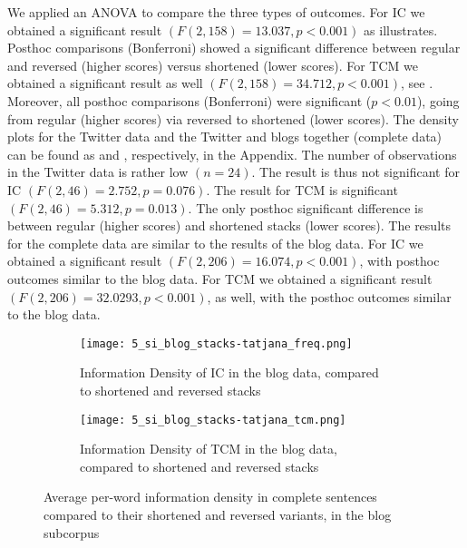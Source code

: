 \documentclass[output=paper,colorlinks,citecolor=brown]{langscibook}
\begin{document}
We applied an ANOVA to compare the three types of outcomes.  For IC we obtained a significant result $(F(2,158)= 13.037, p<0.001)$ as  illustrates.  Posthoc comparisons (Bonferroni) showed a significant difference between regular and reversed (higher scores) versus shortened (lower scores). For TCM we obtained a significant result as well $(F(2,158)= 34.712, p<0.001)$,  see . Moreover, all posthoc comparisons (Bonferroni) were significant ($p <0.01$), going from regular (higher scores) via reversed to shortened (lower scores). The density plots for the Twitter data and the Twitter and blogs together (complete data) can be found as  and , respectively, in the Appendix. The number of observations in the Twitter data is rather low $(n=24)$. The result is thus not significant for IC $(F(2,46) = 2.752, p=0.076)$. The  result for TCM is significant $(F(2,46) = 5.312, p=0.013)$. The only posthoc significant difference is between regular (higher scores) and shortened stacks (lower scores). The results for the complete data are similar to the results of the blog data. For IC we obtained a significant result $(F(2,206)= 16.074, p<0.001)$, with posthoc outcomes similar to the blog data. For TCM we obtained a significant result $(F(2,206)= 32.0293, p<0.001)$, as well, with the posthoc outcomes similar to the blog data.

\begin{figure}[t]
  \centering
\begin{subfigure}[t]{.75\textwidth}
%     
    \texttt{[image: 5\_si\_blog\_stacks-tatjana\_freq.png]}
    \caption{Information Density of IC in the blog data, compared to shortened and reversed stacks}
    \label{fig:blog-ic-short-rev}
\end{subfigure}
\begin{subfigure}[t]{.75\textwidth}
%     
    \texttt{[image: 5\_si\_blog\_stacks-tatjana\_tcm.png]}
    \caption{Information Density of TCM in the blog data, compared to shortened and reversed stacks}
    \label{fig:blog-tcm-short-rev}
\end{subfigure}

\caption{Average per-word information density in complete sentences compared to their shortened and reversed variants, in the blog subcorpus}
\label{fig:infodensity}
\end{figure}
\end{document}
